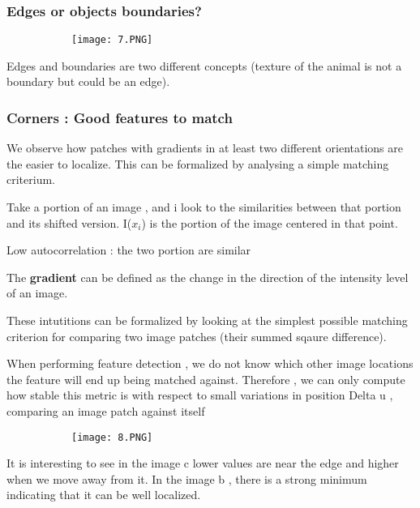 \documentclass{article}
\begin{document}
\subsubsection{Edges or objects boundaries?}

\begin{figure}[ht!]
  \centering
  \begin{subfigure}[b]{0.6\linewidth}
    \texttt{[image: 7.PNG]}
  \end{subfigure}
\end{figure}

Edges and boundaries are two different concepts (texture of the animal is not a boundary but could be an edge).

\subsubsection{Corners : Good features to match}

We observe how patches with gradients in at least two different orientations are the easier to localize.
This can be formalized by analysing a simple matching criterium.

Take a portion of an image , and i look to the similarities between that portion and its shifted version.
I($x_i$) is the portion of the image centered in that point.

Low autocorrelation : the two portion are similar

The \textbf{gradient} can be defined as the change in the direction of the intensity level of an image.


These intutitions can be formalized by looking at the simplest possible matching criterion for comparing two image patches (their summed sqaure difference).

When performing feature detection , we do not know which other image locations the feature will end up being matched against. Therefore , we can only compute how stable this metric is with respect to small variations in position Delta u , comparing an image patch against itself


\begin{figure}[ht!]
  \centering
  \begin{subfigure}[b]{0.8\linewidth}
    \texttt{[image: 8.PNG]}
  \end{subfigure}
\end{figure}

It is interesting to see in the image c lower values are near the edge and higher when we move away from it. In the image b , there is a strong minimum indicating that it can be well localized.
\end{document}
